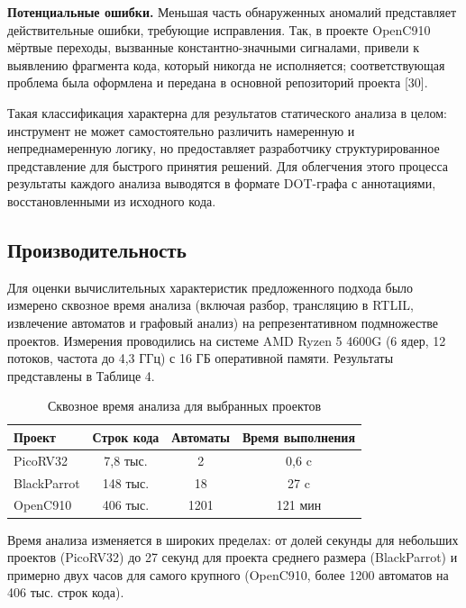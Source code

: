 \textbf{Потенциальные ошибки.} Меньшая часть обнаруженных аномалий представляет действительные ошибки,
требующие исправления. Так, в проекте OpenC910 мёртвые переходы, вызванные константно-значными сигналами,
привели к выявлению фрагмента кода, который никогда не исполняется; соответствующая проблема была оформлена и
передана в основной репозиторий проекта [30].

Такая классификация характерна для результатов статического анализа в целом: инструмент не может
самостоятельно различить намеренную и непреднамеренную логику, но предоставляет разработчику
структурированное представление для быстрого принятия решений. Для облегчения этого процесса результаты
каждого анализа выводятся в формате DOT-графа с аннотациями, восстановленными из исходного кода.

\subsection{Производительность}

Для оценки вычислительных характеристик предложенного подхода было измерено сквозное время анализа
(включая разбор, трансляцию в RTLIL, извлечение автоматов и графовый анализ) на репрезентативном
подмножестве проектов. Измерения проводились на системе AMD Ryzen 5 4600G (6 ядер, 12 потоков, частота
до 4,3 ГГц) с 16 ГБ оперативной памяти. Результаты представлены в Таблице 4.

\begin{table}[h!]
    \centering
    \caption{Сквозное время анализа для выбранных проектов}
    \label{tab:perf1}
    \begin{tabular}{|l|c|c|c|}
        \hline
        Проект & Строк кода & Автоматы & Время выполнения \\ \hline
        PicoRV32  & 7{,}8 тыс.  & 2    & 0{,}6 c  \\ \hline
        BlackParrot & 148 тыс.   & 18   & 27 c    \\ \hline
        OpenC910   & 406 тыс.   & 1201 & 121 мин \\ \hline
    \end{tabular}
\end{table}

Время анализа изменяется в широких пределах: от долей секунды для небольших проектов (PicoRV32) до
27 секунд для проекта среднего размера (BlackParrot) и примерно двух часов для самого крупного
(OpenC910, более 1200 автоматов на 406 тыс. строк кода).

